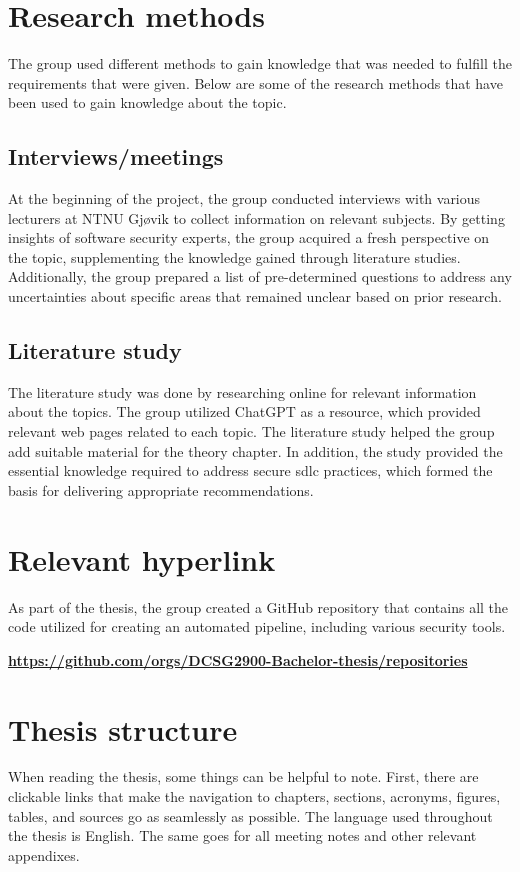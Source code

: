 \section{Research methods}
The group used different methods to gain knowledge that was needed to fulfill the requirements that were given. Below are some of the research methods that have been used to gain knowledge about the topic. 

\subsection{Interviews/meetings}
At the beginning of the project, the group conducted interviews with various lecturers at NTNU Gjøvik to collect information on relevant subjects. By getting insights of software security experts, the group acquired a fresh perspective on the topic, supplementing the knowledge gained through literature studies. Additionally, the group prepared a list of pre-determined questions to address any uncertainties about specific areas that remained unclear based on prior research.  

\subsection{Literature study}
The literature study was done by researching online for relevant information about the topics. The group utilized ChatGPT as a resource, which provided relevant web pages related to each topic. The literature study helped the group add suitable material for the theory chapter. In addition, the study provided the essential knowledge required to address secure \acrshort{sdlc} practices, which formed the basis for delivering appropriate recommendations.

\section{Relevant hyperlink}
As part of the thesis, the group created a GitHub repository that contains all the code utilized for creating an automated pipeline, including various security tools. 

\href{https://github.com/orgs/DCSG2900-Bachelor-thesis/repositories}{\textbf{https://github.com/orgs/DCSG2900-Bachelor-thesis/repositories}}

\section{Thesis structure}
When reading the thesis, some things can be helpful to note. First, there are clickable links that make the navigation to chapters, sections, acronyms, figures, tables, and sources go as seamlessly as possible. The language used throughout the thesis is English. The same goes for all meeting notes and other relevant appendixes. 


